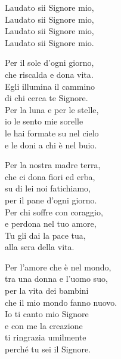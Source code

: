 \documentclass[11pt]{book}
\begin{document}
\consegnanello

\settowidth{\versewidth}{Per la luna e per le stelle,}
\begin{canzone}%
\begin{ritornello}
Laudato sii Signore mio,\\
Laudato sii Signore mio,\\
Laudato sii Signore mio,\\
Laudato sii Signore mio.
\end{ritornello}

Per il sole d'ogni giorno,\\
che riscalda e dona vita.\\
Egli illumina il cammino\\
di chi cerca te Signore.\\
Per la luna e per le stelle,\\
io le sento mie sorelle\\
le hai formate su nel cielo\\
e le doni a chi è nel buio.

Per la nostra madre terra,\\
che ci dona fiori ed erba,\\
su di lei noi fatichiamo,\\
per il pane d'ogni giorno.\\
Per chi soffre con coraggio,\\
e perdona nel tuo amore,\\
Tu gli dai la pace tua,\\ 
alla sera della vita.

Per l'amore che è nel mondo,\\
tra una donna e l'uomo suo,\\
per la vita dei bambini\\
che il mio mondo fanno nuovo.\\
Io ti canto mio Signore\\
e con me la creazione\\
ti ringrazia umilmente\\
perché tu sei il Signore.
\end{canzone}

\introfedeli
\preghierefedeli
\pagebreak

\introlitanie

\litanie
\end{document}
